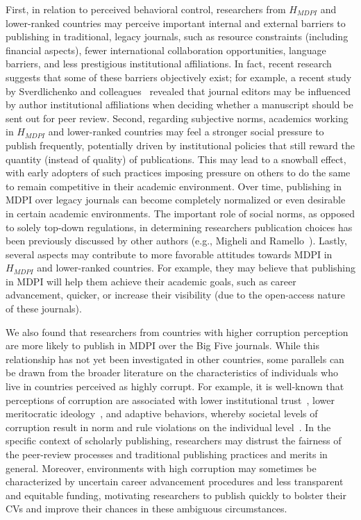 \documentclass[amsfonts, amssymb, prl, superscriptaddress, notitlepage, twocolumn, nofootinbib]{revtex4-2}
\begin{document}
First, in relation to perceived behavioral control, researchers from $H_{MDPI}$ and lower-ranked countries may perceive important internal and external barriers to publishing in traditional, legacy journals, such as resource constraints (including financial aspects), fewer international collaboration opportunities, language barriers, and less prestigious institutional affiliations. In fact, recent research suggests that some of these barriers objectively exist; for example, a recent study by Sverdlichenko and colleagues~\cite{sverdlichenko2022} revealed that journal editors may be influenced by author institutional affiliations when deciding whether a manuscript should be sent out for peer review. Second, regarding subjective norms, academics working in $H_{MDPI}$ and lower-ranked countries may feel a stronger social pressure to publish frequently, potentially driven by institutional policies that still reward the quantity (instead of quality) of publications. This may lead to a snowball effect, with early adopters of such practices imposing pressure on others to do the same to remain competitive in their academic environment. Over time, publishing in MDPI over legacy journals can become completely normalized or even desirable in certain academic environments. The important role of social norms, as opposed to solely top-down regulations, in determining researchers publication choices has been previously discussed by other authors (e.g., Migheli and Ramello~\cite{migheli2013}). Lastly, several aspects may contribute to more favorable attitudes towards MDPI in $H_{MDPI}$ and lower-ranked countries. For example, they may believe that publishing in MDPI will help them achieve their academic goals, such as career advancement, quicker, or increase their visibility (due to the open-access nature of these journals).

We also found that researchers from countries with higher corruption perception are more likely to publish in MDPI over the Big Five journals. While this relationship has not yet been investigated in other countries, some parallels can be drawn from the broader literature on the characteristics of individuals who live in countries perceived as highly corrupt. For example, it is well-known that perceptions of corruption are associated with lower institutional trust~\cite{hakhverdian2012}, lower meritocratic ideology~\cite{tan2017}, and adaptive behaviors, whereby societal levels of corruption result in norm and rule violations on the individual level~\cite{kobis2018}. In the specific context of scholarly publishing, researchers may distrust the fairness of the peer-review processes and traditional publishing practices and merits in general. Moreover, environments with high corruption may sometimes be characterized by uncertain career advancement procedures and less transparent and equitable funding, motivating researchers to publish quickly to bolster their CVs and improve their chances in these ambiguous circumstances. 
\end{document}
